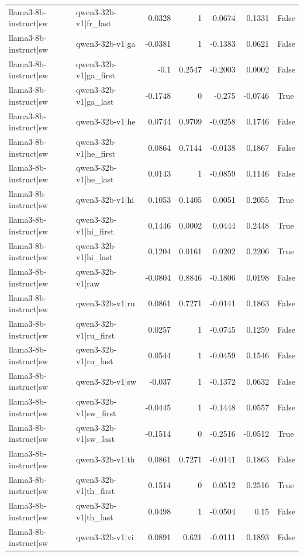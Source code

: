 \begin{table}
\begin{tabular}{l l r r r r l}
llama3-8b-instruct|sw & qwen3-32b-v1|fr_last & 0.0328 & 1 & -0.0674 & 0.1331 & False \\
llama3-8b-instruct|sw & qwen3-32b-v1|ga & -0.0381 & 1 & -0.1383 & 0.0621 & False \\
llama3-8b-instruct|sw & qwen3-32b-v1|ga_first & -0.1 & 0.2547 & -0.2003 & 0.0002 & False \\
llama3-8b-instruct|sw & qwen3-32b-v1|ga_last & -0.1748 & 0 & -0.275 & -0.0746 & True \\
llama3-8b-instruct|sw & qwen3-32b-v1|he & 0.0744 & 0.9709 & -0.0258 & 0.1746 & False \\
llama3-8b-instruct|sw & qwen3-32b-v1|he_first & 0.0864 & 0.7144 & -0.0138 & 0.1867 & False \\
llama3-8b-instruct|sw & qwen3-32b-v1|he_last & 0.0143 & 1 & -0.0859 & 0.1146 & False \\
llama3-8b-instruct|sw & qwen3-32b-v1|hi & 0.1053 & 0.1405 & 0.0051 & 0.2055 & True \\
llama3-8b-instruct|sw & qwen3-32b-v1|hi_first & 0.1446 & 0.0002 & 0.0444 & 0.2448 & True \\
llama3-8b-instruct|sw & qwen3-32b-v1|hi_last & 0.1204 & 0.0161 & 0.0202 & 0.2206 & True \\
llama3-8b-instruct|sw & qwen3-32b-v1|raw & -0.0804 & 0.8846 & -0.1806 & 0.0198 & False \\
llama3-8b-instruct|sw & qwen3-32b-v1|ru & 0.0861 & 0.7271 & -0.0141 & 0.1863 & False \\
llama3-8b-instruct|sw & qwen3-32b-v1|ru_first & 0.0257 & 1 & -0.0745 & 0.1259 & False \\
llama3-8b-instruct|sw & qwen3-32b-v1|ru_last & 0.0544 & 1 & -0.0459 & 0.1546 & False \\
llama3-8b-instruct|sw & qwen3-32b-v1|sw & -0.037 & 1 & -0.1372 & 0.0632 & False \\
llama3-8b-instruct|sw & qwen3-32b-v1|sw_first & -0.0445 & 1 & -0.1448 & 0.0557 & False \\
llama3-8b-instruct|sw & qwen3-32b-v1|sw_last & -0.1514 & 0 & -0.2516 & -0.0512 & True \\
llama3-8b-instruct|sw & qwen3-32b-v1|th & 0.0861 & 0.7271 & -0.0141 & 0.1863 & False \\
llama3-8b-instruct|sw & qwen3-32b-v1|th_first & 0.1514 & 0 & 0.0512 & 0.2516 & True \\
llama3-8b-instruct|sw & qwen3-32b-v1|th_last & 0.0498 & 1 & -0.0504 & 0.15 & False \\
llama3-8b-instruct|sw & qwen3-32b-v1|vi & 0.0891 & 0.621 & -0.0111 & 0.1893 & False \\

\end{tabular}
\end{table}
